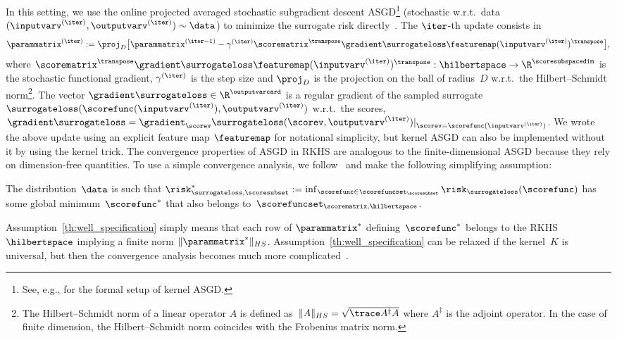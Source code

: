 \documentclass{article}
\begin{document}
%

In this setting, we use the online projected averaged stochastic subgradient descent ASGD\footnote{See, e.g., \cite{orabona2014simultaneous} for the formal setup of kernel ASGD.} (stochastic w.r.t.\ data $(\inputvarv^{(\iter)}, \outputvarv^{(\iter)}) \sim \data$) to minimize the surrogate risk directly~\cite{bousquet2008tradeoffs}. The $\iter$-th update consists in
\begin{equation}
\label{eq:rkhsSgdStep}
\parammatrix^{(\iter)} := \proj_{D} \bigl[\parammatrix^{(\iter-1)} - \gamma^{(\iter)} \scorematrix^\transpose \gradient \surrogateloss \featuremap(\inputvarv^{(\iter)})^\transpose  \bigr],
\end{equation}
where $\scorematrix^\transpose \gradient \surrogateloss \featuremap(\inputvarv^{(\iter)})^\transpose : \hilbertspace \to \R^\scoresubspacedim$ is the stochastic functional gradient, $\gamma^{(\iter)}$ is the step size and $\proj_{D}$ is the projection on the ball of radius~$D$ w.r.t.\ the Hilbert–Schmidt norm\footnote{The Hilbert–Schmidt norm of a linear operator $A$ is defined as~$\|A\|_{HS} = \sqrt{\trace A^\ddagger A }$ where $A^\ddagger$ is the adjoint operator. In the case of finite dimension, the Hilbert–Schmidt norm coincides with the Frobenius matrix norm.}\!\!. The vector $\gradient \surrogateloss \in \R^\outputvarcard$ is a regular gradient of the sampled surrogate $\surrogateloss( \scorefunc(\inputvarv^{(\iter)}), \outputvarv^{(\iter)} )$ w.r.t.\ the scores, $\gradient \surrogateloss = \gradient_\scorev \surrogateloss( \scorev, \outputvarv^{(\iter)} )|_{\scorev = \scorefunc(\inputvarv^{(\iter)})}$.
We wrote the above update using an explicit feature map $\featuremap$ for notational simplicity, but kernel ASGD can also be implemented without it by using the kernel trick.
%
The convergence properties of ASGD in RKHS are analogous to the finite-dimensional ASGD because they rely on dimension-free quantities.
To use a simple convergence analysis, we follow~\citet{ciliberto16} and make the following simplifying assumption:
\begin{assumption}
    \label{th:well_specification}
    The distribution~$\data$ is such that $\risk_{\surrogateloss,\scoresubset}^* := \inf_{\scorefunc \in \scorefuncset_\scoresubset} \risk_\surrogateloss(\scorefunc)$ has some global minimum~$\scorefunc^*$ that also belongs to~$\scorefuncset_{\scorematrix, \hilbertspace}$.
\end{assumption}
Assumption~\ref{th:well_specification} simply means that each row of
$\parammatrix^*$ defining~$\scorefunc^*$ belongs to the RKHS~$\hilbertspace$ implying a finite norm $\| \parammatrix^* \|_{HS}$.
Assumption~\ref{th:well_specification} can be relaxed if the kernel~$K$ is universal, but then the convergence analysis becomes much more complicated~\cite{orabona2014simultaneous}.
\end{document}
